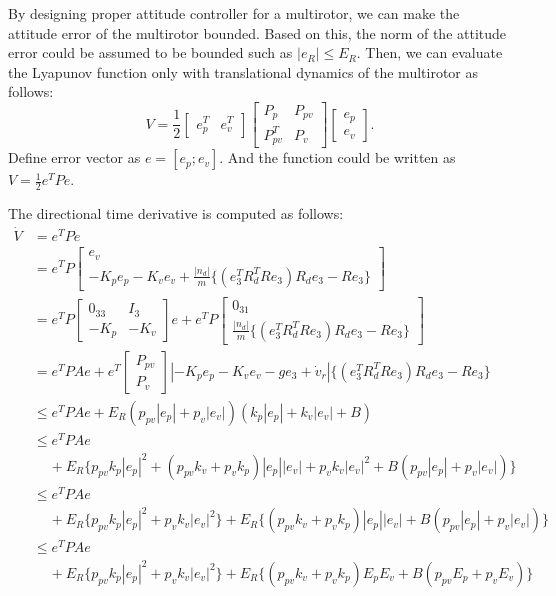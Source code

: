 \documentclass{article}
\begin{document}
\newpage
By designing proper attitude controller for a multirotor, we can make the attitude error of the multirotor bounded.
Based on this, the norm of the attitude error could be assumed to be bounded such as $|e_R| \leq E_R$.
Then, we can evaluate the Lyapunov function only with translational dynamics of the multirotor as follows:
\begin{equation}
    V = \frac{1}{2}\left[
        \begin{array}{cc}
        e_p^T & e_v^T
        \end{array}
        \right] 
        \left[
        \begin{array}{cc}
		P_p & P_{pv} \\ P_{pv}^T & P_v
        \end{array}
        \right]
		\left[
		\begin{array}{c}
		e_p \\ e_v
		\end{array}
		\right]. \nonumber
\end{equation}
Define error vector as $e = [e_p;e_v]$. And the function could be written as $V=\frac{1}{2}e^TPe$.

The directional time derivative is computed as follows:
\begin{align}
\dot{V} &= e^TP\dot{e} \nonumber \\
&= e^TP\left[
\begin{array}{l}
e_v \\ -K_pe_p -K_ve_v + \frac{|n_d|}{m}\{(e_3^TR_d^TRe_3)R_de_3-Re_3\} 
\end{array}
\right] \nonumber \\
&= e^TP\left[
\begin{array}{cc}
0_{33} & I_3 \\ -K_p & -K_v
\end{array}
\right]e + 
e^TP\left[
\begin{array}{c}
0_{31} \\ \frac{|n_d|}{m}\{(e_3^TR_d^TRe_3)R_de_3-Re_3\} 
\end{array}
\right] \nonumber \\
&= e^TPAe + e^T
\left[
\begin{array}{c}
P_{pv} \\ P_v
\end{array}
\right]
|-K_p e_p -K_v e_v - ge_3 + \dot{v}_r|\{(e_3^TR_d^TRe_3)R_de_3-Re_3\} \nonumber \\
&\leq e^TPAe+ E_R(p_{pv}|e_p|+p_v|e_v|)(k_p|e_p|+k_v|e_v|+B) \nonumber  \\
&\leq e^TPAe \nonumber \\
&\;\;\;\;+E_R\{p_{pv}k_p |e_p|^2+(p_{pv}k_v+p_vk_p)|e_p||e_v|+p_vk_v|e_v|^2 +B(p_{pv}|e_p|+p_v|e_v|)\}\nonumber \\
&\leq e^TPAe \nonumber \\
&\;\;\;\;+E_R\{p_{pv}k_p|e_p|^2+p_vk_v|e_v|^2\} + E_R\{(p_{pv}k_v+p_vk_p)|e_p||e_v| + B(p_{pv}|e_p|+p_v|e_v|)\} \nonumber \\
&\leq e^TPAe \nonumber \\
&\;\;\;\;+E_R\{p_{pv}k_p|e_p|^2+p_vk_v|e_v|^2\} + E_R\{(p_{pv}k_v+p_vk_p)E_pE_v + B(p_{pv}E_p+p_vE_v)\} \nonumber 
\end{align}
\end{document}

